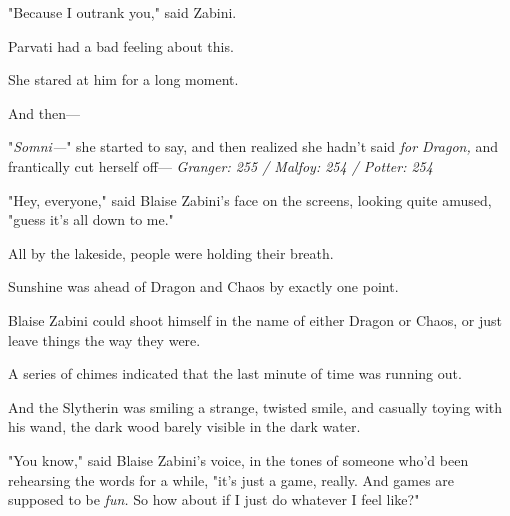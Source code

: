 "Because I outrank you," said Zabini.

Parvati had a bad feeling about this.

She stared at him for a long moment.

And then---

"\emph{Somni---}" she started to say, and then realized she hadn't said \emph{for
Dragon,} and frantically cut herself off---
\later
\emph{Granger: 255 / Malfoy: 254 / Potter: 254}

"Hey, everyone," said Blaise Zabini's face on the screens, looking quite
amused, "guess it's all down to me."

All by the lakeside, people were holding their breath.

Sunshine was ahead of Dragon and Chaos by exactly one point.

Blaise Zabini could shoot himself in the name of either Dragon or Chaos, or
just leave things the way they were.

A series of chimes indicated that the last minute of time was running out.

And the Slytherin was smiling a strange, twisted smile, and casually toying
with his wand, the dark wood barely visible in the dark water.

"You know," said Blaise Zabini's voice, in the tones of someone who'd been
rehearsing the words for a while, "it's just a game, really. And games are
supposed to be \emph{fun.} So how about if I just do whatever I feel like?"
